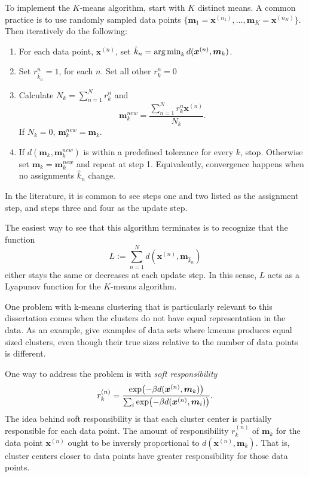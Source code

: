 To implement the \(K\)-means algorithm, start with \(K\) distinct means.  
A common practice is to use randomly sampled data points 
\(\{\bm m_1 = \bm x^{(n_1)},\ldots,\bm m_K = \bm x^{(n_K)}\}\). Then iteratively 
do the following:
\begin{enumerate}
	\item For each data point, \(\bm x^{(n)}\), set 
	\(\hat{k}_n = \operatorname*{arg\,min}_k d(\bm x^{(n)},\bm m_k)\).
	\item Set \(r_{\hat{k}_n}^{n} = 1\), for each \(n\). Set all other 
	\(r_k^n = 0\)
	\item Calculate \(N_k = \sum_{n=1}^{N} r^n_k\) and 
	\[\bm m_k^{new} = \frac{\sum_{n=1}^{N} r_k^n \bm x^{(n)}}{N_k}.\]
	If \(N_k = 0\), \(\bm m_k^{new} = \bm m_k\).
	\item If \(d(\bm m_k ,\bm m_k^{new})\) is within a predefined tolerance for every \( k \), 
	stop.  Otherwise set \(\bm m_k = \bm m_k^{new}\) and repeat at step 1. Equivalently, convergence happens when no assignments \( \hat{k}_n \) change. 
\end{enumerate}
In the literature, it is common to see steps one and two listed as the 
assignment step, and steps three and four as the update step.  

The easiest way to see that this algorithm terminates is to recognize that the 
function \[L := \sum_{n=1}^{N} d(\bm x^{(n)},\bm m_{\hat{k}_n})\]
either stays the same or decreases at each update step.  In this sense, \(L\) 
acts as a Lyapunov function for the \(K\)-means algorithm.

One problem with k-means clustering that is particularly relevant to this 
dissertation comes when the clusters do not have equal representation in the data.
As an example, \cite{xiong2009kmeansvalid} give examples of data sets where kmeans produces equal sized clusters, even though their true sizes relative to the number of data points is different. %

One way to address the problem is with \textit{soft responsibility} 
\begin{equation}\label{softResp}
r_k^{(n)} = \frac{\exp(-\beta d(\bm x^{(n)},\bm m_k))}
{\sum_i \exp(-\beta d(\bm x^{(n)},\bm m_i))}.
\end{equation}
The idea behind soft responsibility is that each cluster center is partially 
responsible for each data point.  The amount of responsibility \(r_k^{(n)}\) 
of \(\bm m_k\) for the data point \(\bm x^{(n)}\) ought to be inversly 
proportional to \(d(\bm x^{(n)},\bm m_k)\). That is, cluster centers closer to 
data points have greater responsibility for those data points.  


